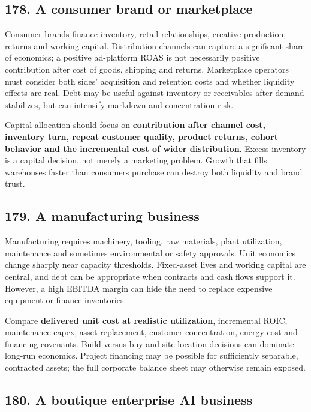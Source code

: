 \subsection{178. A consumer brand or marketplace}


Consumer brands finance inventory, retail relationships, creative production, returns and working capital. Distribution channels can capture a significant share of economics; a positive ad-platform ROAS is not necessarily positive contribution after cost of goods, shipping and returns. Marketplace operators must consider both sides' acquisition and retention costs and whether liquidity effects are real. Debt may be useful against inventory or receivables after demand stabilizes, but can intensify markdown and concentration risk.

Capital allocation should focus on \textbf{contribution after channel cost, inventory turn, repeat customer quality, product returns, cohort behavior and the incremental cost of wider distribution}. Excess inventory is a capital decision, not merely a marketing problem. Growth that fills warehouses faster than consumers purchase can destroy both liquidity and brand trust.

\subsection{179. A manufacturing business}


Manufacturing requires machinery, tooling, raw materials, plant utilization, maintenance and sometimes environmental or safety approvals. Unit economics change sharply near capacity thresholds. Fixed-asset lives and working capital are central, and debt can be appropriate when contracts and cash flows support it. However, a high EBITDA margin can hide the need to replace expensive equipment or finance inventories.

Compare \textbf{delivered unit cost at realistic utilization}, incremental ROIC, maintenance capex, asset replacement, customer concentration, energy cost and financing covenants. Build-versus-buy and site-location decisions can dominate long-run economics. Project financing may be possible for sufficiently separable, contracted assets; the full corporate balance sheet may otherwise remain exposed.

\subsection{180. A boutique enterprise AI business}


